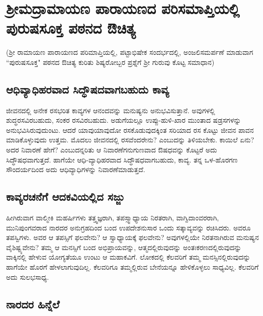 \chapter{ಶ್ರೀಮದ್ರಾಮಾಯಣ ಪಾರಾಯಣದ ಪರಿಸಮಾಪ್ತಿಯಲ್ಲಿ ಪುರುಷಸೂಕ್ತ ಪಠನದ ಔಚಿತ್ಯ}

(ಶ್ರೀ ರಾಮಾಯಣ ಪಾರಾಯಣದ ಪರಿಮಾಪ್ತಿಯಲ್ಲಿ, ಪಟ್ಟಾಭಿಷೇಕ ಸಂದರ್ಭದಲ್ಲಿ, ಅಂಜಲಿಸಮರ್ಪಣೆ ಮಾಡುವಾಗ ``ಪುರುಷಸೂಕ್ತ" ಪಠನದ ಔಚಿತ್ಯ ಕುರಿತು ಶಿಷ್ಯರೋಬ್ಬರ ಪ್ರಶ್ನೆಗೆ ಶ್ರೀ ಗುರುವು ಕೊಟ್ಟ ಸಮಾಧಾನ)

\section*{ಆಧಿವ್ಯಾಧಿಹರವಾದ ಸಿದ್ಧೌಷದವಾಗಬಹುದು ಕಾವ್ಯ}

ಜೀವನದಲ್ಲಿ ಅನೇಕ ರಸಭರಿತ ಕಾವ್ಯಗಳ ಆನಂದವನ್ನು ಮನುಷ್ಯನು ಅನುಭವಿಸುತ್ತಾನೆ. ಅವುಗಳಲ್ಲಿ ಶುದ್ಧರಸವಿರಬಹುದು, ಸಂಕರ ರಸವಿರಬಹುದು. ಅಡುಗೆಯಲ್ಲೂ ಉಪ್ಪು-ಹುಳಿ-ಖಾರ ಮುಂತಾದ ಷಡ್ರಸಗಳನ್ನು ಅನುಭವಿಸಿರುವುದುಂಟು. ಆದರೆ ಯಾವುಯಾವುದೋ ರಸಕೊಡುವುದಕ್ಕಿಂತ ಸರಿಯಾದ ರಸ ಕೊಟ್ಟು ಜೀವನ ಪಾವನ ಮಾಡಿಕೊಳ್ಳುವುದು ಉತ್ತಮ. ಮೊದಲು ಜೀವನದಲ್ಲಿ ರಸವೆಂದರೇನು? ಎಂಬುದನ್ನು ತಿಳಿಯಬೇಕು. ಕಾಯಿಲೆ ಏನು? ಅದರ ನಿವಾರಣೆ ಹೇಗೆ? ಎಂಬುದನ್ನರಿತು ಆ ನಿವಾರಣೆಗನುಗುಣವಾದ ಔಷಧವನ್ನು ಕೊಟ್ಟರೆ ಅದು ಸಿದ್ಧೌಷಧವಾಗುತ್ತದೆ. ಹಾಗೆಯೇ ಆಧಿ-ವ್ಯಾಧಿಹರವಾದ ಸಿದ್ಧೌಷಧವಾಗಬಹುದು, ಕಾವ್ಯ. ತನ್ನ ಒಳ-ಹೊರಗಣ ಸೌಂದರ್ಯದಿಂದ ಅದು ಆಧಿವ್ಯಾಧಿಗಳನ್ನು ನಿವಾರಣೆಮಾಡುತ್ತದೆ. 

\section*{ಕಾವ್ಯರಚನೆಗೆ ಆದಕವಿಯಲ್ಲಿದ ಸಜ್ಜು}

ಹೀಗಿರುವಾಗ ವಾಲ್ಮೀಕಿ ಮಹರ್ಷಿಗಳು ತತ್ತ್ವಜ್ಞರಾಗಿ, ತಪಸ್ಸ್ವಾಧ್ಯಾಯ ನಿರತರಾಗಿ, ವಾಗ್ವಿದಾಂವರರಾಗಿ, ಮುನಿಪುಂಗವರಾದ ನಾರದರ ಅನುಗ್ರಹದಿಂದ ಬಂದ ಉಪದೇಶನುಸಾರ ಒಂದು ಸತ್ಕಾವ್ಯವನ್ನು ರಚಿಸಿದರು. ಅವರೂ ತಪಸ್ವಿಗಳು. ಅವರ ಆ ತಪಸ್ಸಿಗೆ ಫಲವೇನು? ಆ ಸ್ವಾಧ್ಯಾಯಕ್ಕೆ ಫಲವೇನು? ಅವುಗಳಲ್ಲಿಯೇ ನಿರತನಾಗಿರುವ ಮನುಷ್ಯನ ವೈಶಿಷ್ಟ್ಯವೇನು? ತಮ್ಮ ಆ ಮನಸ್ಸಿಗೆ ಬಂದ ಅಭಿಪ್ರಾಯವನ್ನು, ಆತ್ಮದಲ್ಲಿರುವುದನ್ನು ಅಂತಃಕರಣದಲ್ಲಿರುವುದನ್ನು ವಾಕ್ಕಿನಲ್ಲಿ ಹೇಳುವ ಯೋಗ್ಯತೆಯೂ ಉಂಟು ಆ ಮಹಾಕವಿಗೆ. ಲೋಕದಲ್ಲಿ ಕೆಲವರಿಗೆ ತಮ್ಮ ಮನಸ್ಸಿನಲ್ಲಿರುವುದನ್ನು ಹಾಗೆಯೇ ಹೊರಗೆ ಹೇಳಲಾಗುವುದಿಲ್ಲ. ಕೆಲವರಿಗೂ ತಮ್ಮಲ್ಲಿರುವ ಬೇನೆಯನ್ನೂ ಹೇಳಿಕೊಳ್ಳಲು ಸಾಧ್ಯವಿಲ್ಲ. ಕೆಲವರಿಗೆ ಅದು ಸುಲಭಸಾಧ್ಯ.

\section*{ನಾರದರ ಹಿನ್ನೆಲೆ}


